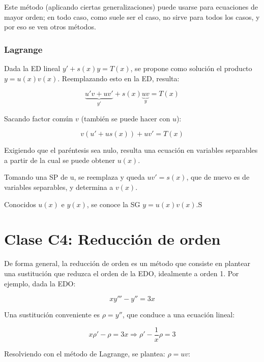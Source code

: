 \documentclass{article}
\begin{document}
Este método (aplicando ciertas generalizaciones) puede usarse para ecuaciones de mayor orden; en todo caso, como suele ser el caso, no sirve para todos los casos, y por eso se ven otros métodos.

\subsubsection{Lagrange}

Dada la ED lineal $y' + s(x) y = T(x)$, se propone como solución el producto $y = u(x) v(x)$. Reemplazando esto en la ED, resulta:

\begin{equation}
\underbrace{u'v + uv'}_{y'} + s(x) \underbrace{uv}_{y} = T(x)
\end{equation}

Sacando factor común $v$ (también se puede hacer con $u$):

\begin{equation}
v (u' + u s(x)) + uv' = T(x)
\end{equation}

Exigiendo que el paréntesis sea nulo, resulta una ecuación en variables separables a partir de la cual se puede obtener $u(x)$.

Tomando una SP de u, se reemplaza y queda $uv' = s(x)$, que de nuevo es de variables separables, y determina a $v(x)$.

Conocidos $u(x)$ e $y(x)$, se conoce la SG $y = u(x) v(x)$.S

\section{Clase C4: Reducción de orden}

De forma general, la reducción de orden es un método que consiste en plantear una sustitución que reduzca el orden de la EDO, idealmente a orden 1. Por ejemplo, dada la EDO:

\begin{equation}
xy''' - y'' = 3x
\end{equation}

Una sustitución conveniente es $\rho = y''$, que conduce a una ecuación lineal:

\begin{equation}
x \rho' - \rho = 3x \Rightarrow \rho' - \frac{1}{x} \rho = 3
\end{equation}

Resolviendo con el método de Lagrange, se plantea: $\rho = u v$:
\end{document}
